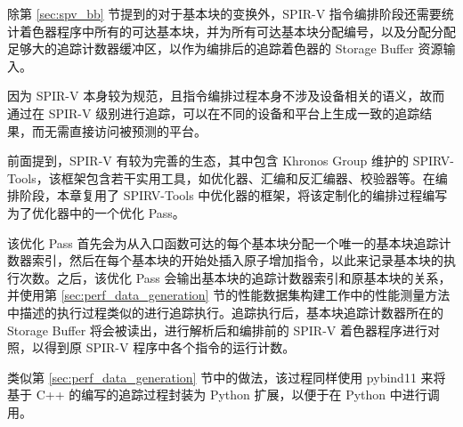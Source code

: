 除第 \ref{sec:spv_bb} 节提到的对于基本块的变换外，SPIR-V 指令编排阶段还需要统计着色器程序中所有的可达基本块，并为所有可达基本块分配编号，以及分配分配足够大的追踪计数器缓冲区，以作为编排后的追踪着色器的 Storage Buffer 资源输入。

因为 SPIR-V 本身较为规范，且指令编排过程本身不涉及设备相关的语义，故而通过在 SPIR-V 级别进行追踪，可以在不同的设备和平台上生成一致的追踪结果，而无需直接访问被预测的平台。

前面提到，SPIR-V 有较为完善的生态，其中包含 Khronos Group 维护的 SPIRV-Tools，该框架包含若干实用工具，如优化器、汇编和反汇编器、校验器等。在编排阶段，本章复用了 SPIRV-Tools 中优化器的框架，将该定制化的编排过程{\amend 编写为了}优化器中的一个优化 Pass。

{\amend 该优化 Pass 首先会}为从入口函数可达的每个基本块分配一个唯一的基本块追踪计数器索引，然后在每个基本块的开始处插入原子增加指令，以此来记录基本块的执行次数。之后，该优化 Pass 会输出基本块的追踪计数器索引和原基本块的关系，并使用第 \ref{sec:perf_data_generation} 节{\amend 的性能数据集构建工作中}的性能测量方法中描述的执行过程类似的进行追踪执行。追踪执行后，基本块追踪计数器所在的 Storage Buffer 将会被读出，进行解析{\amend 后}和编排前的 SPIR-V 着色器程序进行对照，{\amend 以}得到原 SPIR-V 程序中各个指令的运行计数。

类似第 \ref{sec:perf_data_generation} 节中的做法，{\amend 该过程}同样使用 pybind11 来将{\amend 基于 C++ 的编写的追踪}过程封装为 Python 扩展，以便于在 Python 中进行调用。

